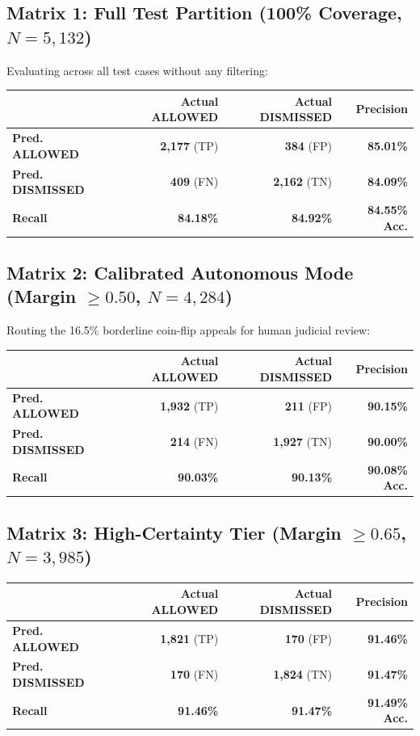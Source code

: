 \documentclass[journal,10pt,twocolumn]{IEEEtran}
\begin{document}
\subsection{Matrix 1: Full Test Partition (100\% Coverage, $N = 5,132$)}
Evaluating across all test cases without any filtering:
\begin{center}
\begin{tabular}{lrrr}
\toprule
& \textbf{Actual ALLOWED} & \textbf{Actual DISMISSED} & \textbf{Precision} \\
\midrule
\textbf{Pred. ALLOWED} & \textbf{2,177} (TP) & \textbf{384} (FP) & \textbf{85.01\%} \\
\textbf{Pred. DISMISSED} & \textbf{409} (FN) & \textbf{2,162} (TN) & \textbf{84.09\%} \\
\midrule
\textbf{Recall} & \textbf{84.18\%} & \textbf{84.92\%} & \textbf{84.55\% Acc.} \\
\bottomrule
\end{tabular}
\end{center}

\subsection{Matrix 2: Calibrated Autonomous Mode (Margin $\ge 0.50$, $N = 4,284$)}
Routing the 16.5\% borderline coin-flip appeals for human judicial review:
\begin{center}
\begin{tabular}{lrrr}
\toprule
& \textbf{Actual ALLOWED} & \textbf{Actual DISMISSED} & \textbf{Precision} \\
\midrule
\textbf{Pred. ALLOWED} & \textbf{1,932} (TP) & \textbf{211} (FP) & \textbf{90.15\%} \\
\textbf{Pred. DISMISSED} & \textbf{214} (FN) & \textbf{1,927} (TN) & \textbf{90.00\%} \\
\midrule
\textbf{Recall} & \textbf{90.03\%} & \textbf{90.13\%} & \textbf{90.08\% Acc.} \\
\bottomrule
\end{tabular}
\end{center}

\subsection{Matrix 3: High-Certainty Tier (Margin $\ge 0.65$, $N = 3,985$)}
\begin{center}
\begin{tabular}{lrrr}
\toprule
& \textbf{Actual ALLOWED} & \textbf{Actual DISMISSED} & \textbf{Precision} \\
\midrule
\textbf{Pred. ALLOWED} & \textbf{1,821} (TP) & \textbf{170} (FP) & \textbf{91.46\%} \\
\textbf{Pred. DISMISSED} & \textbf{170} (FN) & \textbf{1,824} (TN) & \textbf{91.47\%} \\
\midrule
\textbf{Recall} & \textbf{91.46\%} & \textbf{91.47\%} & \textbf{91.49\% Acc.} \\
\bottomrule
\end{tabular}
\end{center}
\end{document}
